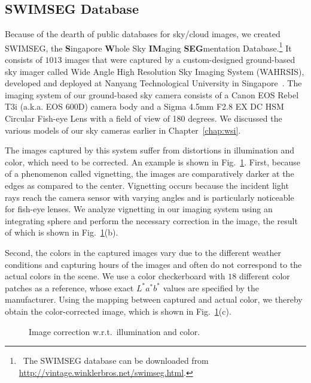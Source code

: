 \subsection{SWIMSEG Database}
Because of the dearth of public databases for sky/cloud images, we created SWIMSEG, the \textbf{S}ingapore \textbf{W}hole Sky \textbf{IM}aging \textbf{SEG}mentation Database.\footnote{~The SWIMSEG database can be downloaded from \url{http://vintage.winklerbros.net/swimseg.html}.} It consists of $1013$ images that were captured by a custom-designed ground-based sky imager called Wide Angle High Resolution Sky Imaging System (WAHRSIS), developed and deployed at Nanyang Technological University in Singapore~\cite{WAHRSIS}. 
The imaging system of our ground-based sky camera consists of a Canon EOS Rebel T3i (a.k.a. EOS 600D) camera body and a Sigma 4.5mm F2.8 EX DC HSM Circular Fish-eye Lens with a field of view of 180 degrees. We discussed the various models of our sky cameras earlier in Chapter~\ref{chap:wsi}.

The images captured by this system suffer from distortions in illumination and color, which need to be corrected.  An example is shown in Fig.~\ref{fig:pre-process}. First, because of a phenomenon called vignetting, the images are comparatively darker at the edges as compared to the center. Vignetting occurs because the incident light rays reach the camera sensor with varying angles and is particularly noticeable for fish-eye lenses. We analyze vignetting in our imaging system using an integrating sphere \cite{WAHRSIS}  and perform the necessary correction in the image, the result of which is shown in Fig.~\ref{fig:pre-process}(b). 

Second, the colors in the captured images vary due to the different weather conditions and capturing hours of the images  and often do not correspond to the actual colors in the scene. We use a color checkerboard with $18$ different color patches as a reference, whose exact $L^{*}a^{*}b^{*}$ values are specified by the manufacturer. Using the mapping between captured and actual color, we thereby obtain the color-corrected image, which is shown in Fig.~\ref{fig:pre-process}(c).
 
\begin{figure}[htb]
\centering
\caption[Illustration to show vignetting- and color-correction.]{Image correction w.r.t.\ illumination and color.}\label{fig:pre-process}
\end{figure}


